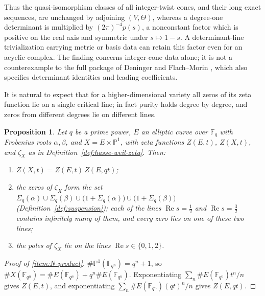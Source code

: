 \documentclass[11pt]{amsart}
\theoremstyle{plain}
\newtheorem{proposition}[theorem]{Proposition}
\theoremstyle{definition}
\theoremstyle{remark}
\numberwithin{equation}{section}
\newcommand{\F}{\mathbb{F}}
\DeclareMathOperator{\Rea}{Re}
\renewcommand{\Re}{\Rea}
\begin{document}
Thus the quasi-isomorphism classes of all integer-twist cones, and
their long exact sequences, are unchanged by adjoining $(V,\Theta)$,
whereas a degree-one determinant is multiplied by $(2\pi)^{-4}p(s)$, a
nonconstant factor which is positive on the real axis and symmetric
under $s\mapsto1-s$. A determinant-line trivialization carrying metric
or basis data can retain this factor even for an acyclic complex. The
finding concerns integer-cone data alone; it is not a counterexample to
the full package of Deninger and Flach--Morin
\cite[Conjecture~4.1]{FlachMorin2020DeningerWeilArakelov}, which also
specifies determinant identities and leading coefficients.

It is natural to expect that for a higher-dimensional variety all zeros
of its zeta function lie on a single critical line; in fact purity
holds degree by degree, and zeros from different degrees lie on
different lines.

\begin{proposition}\label{prop:N-lines}
Let $q$ be a prime power, $E$ an elliptic curve over $\F_q$ with
Frobenius roots $\alpha,\beta$, and $X=E\times\mathbb{P}^1$, with zeta
functions $Z(E,t)$, $Z(X,t)$, and $\zeta_X$ as in
Definition~\ref{def:hasse-weil-zeta}. Then:
\begin{enumerate}[label=(\roman*)]
\item\label{item:N-product} $Z(X,t)=Z(E,t)\,Z(E,qt)$;
\item\label{item:N-zeros} the zeros of $\zeta_X$ form the set
  $\Sigma_q(\alpha)\cup\Sigma_q(\beta)\cup
  \bigl(1+\Sigma_q(\alpha)\bigr)\cup\bigl(1+\Sigma_q(\beta)\bigr)$
  (Definition~\ref{def:suspension}); each of the lines
  $\Re s=\tfrac12$ and $\Re s=\tfrac32$ contains infinitely many of
  them, and every zero lies on one of these two lines;
\item\label{item:N-poles} the poles of $\zeta_X$ lie on the lines
  $\Re s\in\{0,1,2\}$.
\end{enumerate}
\end{proposition}

\begin{proof}[Proof of \ref{item:N-product}]
$\#\mathbb{P}^1(\F_{q^n})=q^n+1$, so
$\#X(\F_{q^n})=\#E(\F_{q^n})+q^n\#E(\F_{q^n})$. Exponentiating
$\sum_n\#E(\F_{q^n})t^n/n$ gives $Z(E,t)$, and exponentiating
$\sum_n\#E(\F_{q^n})(qt)^n/n$ gives $Z(E,qt)$.
\end{proof}
\end{document}
